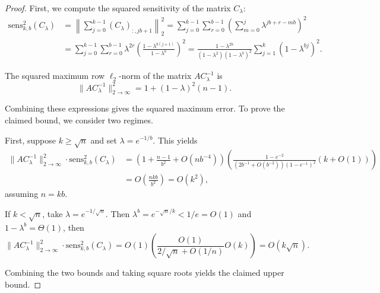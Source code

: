 \documentclass{article}
\theoremstyle{plain}
\theoremstyle{definition}
\theoremstyle{remark}
\begin{document}
\MaxSEBound*
\begin{proof}
First, we compute the squared sensitivity of the matrix $C_{\lambda}$:
\begin{align}
    \mathrm{sens}_{k,b}^2(C_{\lambda})
    &= \left\|\sum\limits_{j = 0}^{k - 1}(C_\lambda)_{:, jb + 1}\right\|_2^2
    = \sum\limits_{j = 0}^{k - 1}\sum\limits_{r = 0}^{b - 1}
      \left(\sum\limits_{m = 0}^{j}\lambda^{jb + r - mb}\right)^2  \\
    &= \sum\limits_{j = 0}^{k - 1}\sum\limits_{r = 0}^{b - 1}
      \lambda^{2r} \left(\frac{1 - \lambda^{b(j + 1)}}{1 - \lambda^b}\right)^2
     = \frac{1 - \lambda^{2b}}{(1- \lambda^2)(1 - \lambda^b)^2}\sum\limits_{j = 1}^{k}(1 - \lambda^{bj})^2.
\end{align}

The squared maximum row $\ell_2$-norm of the matrix $AC_{\lambda}^{-1}$ is
\begin{equation}
    \|AC_{\lambda}^{-1}\|_{2\to \infty}^2 = 1 + (1 - \lambda)^2(n - 1).
\end{equation}

Combining these expressions gives the squared maximum error. To prove the claimed bound, we consider two regimes.

First, suppose $k \ge \sqrt{n}$ and set $\lambda = e^{-1/b}$. This yields
\begin{align}
    \|AC_{\lambda}^{-1}\|_{2\to \infty}^2 \cdot \mathrm{sens}_{k,b}^2(C_{\lambda}) &= \left(1 + \frac{n - 1}{b^2} + O(nb^{-4})\right) \left(\frac{1 - e^{-2}}{(2b^{-1} + O(b^{-2}))(1 - e^{-1})^2} (k + O(1))\right)\\
    &= O\left(\frac{nkb}{b^2}\right) = O(k^2),
\end{align}
assuming $n=kb$.

If $k < \sqrt{n}$, take $\lambda = e^{-1/\sqrt{n}}$. Then $\lambda^b = e^{-\sqrt{n}/k} < 1/e = O(1)$ and $1 -\lambda^{b} = \Theta(1)$, then
\begin{equation}
    \|AC_{\lambda}^{-1}\|_{2\to \infty}^2 \cdot \mathrm{sens}_{k,b}^2(C_{\lambda}) = O(1) \left(\frac{O(1)}{2/\sqrt{n} + O(1/n)}O(k)\right) = O(k\sqrt{n}).
\end{equation}

Combining the two bounds and taking square roots yields the claimed upper bound.
\end{proof}
\end{document}
